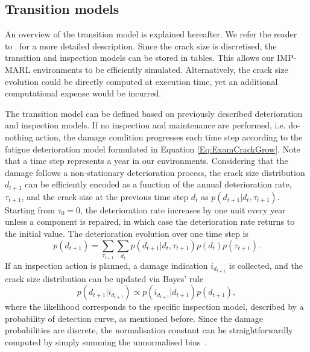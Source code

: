 \subsection{Transition models}
An overview of the transition model is explained hereafter.
We refer the reader to~\citep{morato2022syst} for a more detailed description.
Since the crack size is discretised, the transition and inspection models can be stored in tables.
This allows our IMP-MARL environments to be efficiently simulated.
Alternatively, the crack size evolution could be directly computed at execution time, yet an additional computational expense would be incurred.

The transition model can be defined based on previously described deterioration and inspection models. 
If no inspection and maintenance are performed, i.e. do-nothing action, the damage condition progresses each time step according to the fatigue deterioration model formulated in Equation \ref{Eq:ExamCrackGrow}.
Note that a time step represents a year in our environments.
Considering that the damage follows a non-stationary deterioration process, the crack size distribution $d_{t+1}$ can be efficiently encoded as a function of the annual deterioration rate, $\tau_{t+1}$, and the crack size at the previous time step $d_{t}$ as $p(d_{t+1}|d_t,\tau_{t+1})$. 
Starting from $\tau_{0}=0$, the deterioration rate increases by one unit every year unless a component is repaired, in which case the deterioration rate returns to the initial value. 
The deterioration evolution over one time step is
\begin{equation} \label{eq:ex_pod2}
    p(d_{t+1}) =  \sum_{\tau_{t+1}} \sum_{d_t} p(d_{t+1}|d_t,\tau_{t+1}) p(d_{t}) p(\tau_{t+1}) .
\end{equation}
If an inspection action is planned, a damage indication $i_{d_{t+1}}$ is collected, and the crack size distribution can be updated via Bayes' rule
\begin{equation} \label{eq:ex_pod3}
    p(d_{t+1}|i_{d_{t+1}}) \propto  p(i_{d_{t+1}}|d_{t+1}) p(d_{t+1})   ,
\end{equation}
where the likelihood corresponds to the specific inspection model, described by a probability of detection curve, as mentioned before.
Since the damage probabilities are discrete, the normalisation constant can be straightforwardly computed by simply summing the unnormalised bins~\citep{morato2022optimal}.

